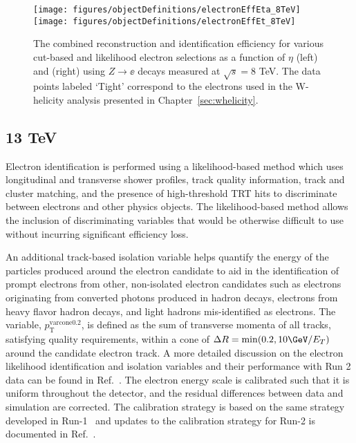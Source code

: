 \begin{figure}[h!]
\centering
\label{fig:electronEff8TeV}
\texttt{[image: figures/objectDefinitions/electronEffEta\_8TeV]}
\texttt{[image: figures/objectDefinitions/electronEffEt\_8TeV]}
\caption{The combined reconstruction and identification efficiency for various cut-based and likelihood electron selections as a function of $\eta$ (left) and \et (right) using $Z\rightarrow \ee$ decays measured at $\sqrt{s}=8$ TeV. The data points labeled `Tight' correspond to the electrons used in the W-helicity analysis presented in Chapter~\ref{sec:whelicity}.}
\end{figure}

\subsection{13 TeV}
\label{sec:electron13TeV}
Electron identification is performed using a likelihood-based method which uses longitudinal and transverse shower profiles, track quality information, track and cluster matching, and the presence of high-threshold TRT hits to discriminate between electrons and other physics objects. The likelihood-based method allows the inclusion of discriminating variables that would be otherwise difficult to use without incurring significant efficiency loss. 

An additional track-based isolation variable helps quantify the energy of the particles produced around the electron candidate to aid in the identification of prompt electrons from other, non-isolated electron candidates such as electrons originating from converted photons produced in hadron decays, electrons from heavy flavor hadron decays, and light hadrons mis-identified as electrons. The variable, $p_{\text{T}}^{\text{varcone0.2}}$, is defined as the sum of transverse momenta of all tracks, satisfying quality requirements, within a cone of $\Delta R = \mathrm{min}(0.2,10 \GeV/E_{T})$ around the candidate electron track. A more detailed discussion on the electron likelihood identification and isolation variables and their performance with Run 2 data can be found in Ref.~\cite{ATLAS-CONF-2016-024}. The electron energy scale is calibrated such that it is uniform throughout the detector, and the residual differences between data and simulation are corrected. The calibration strategy is based on the same strategy developed in Run-1~\cite{ATLAS-EGAMMACALIB-RUN1} and updates to the calibration strategy for Run-2 is documented in Ref.~\cite{ATL-PHYS-PUB-2016-015}.

